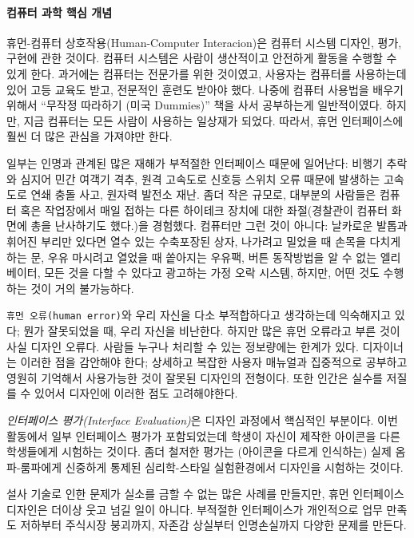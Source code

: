 \documentclass[]{article}
\begin{document}
\mbox{}\paragraph{컴퓨터 과학 핵심 개념}\label{section-268}

휴먼-컴퓨터 상호작용(Human-Computer Interacion)은 컴퓨터 시스템 디자인,
평가, 구현에 관한 것이다. 컴퓨터 시스템은 사람이 생산적이고 안전하게
활동을 수행할 수 있게 한다. 과거에는 컴퓨터는 전문가를 위한 것이였고,
사용자는 컴퓨터를 사용하는데 있어 고등 교육도 받고, 전문적인 훈련도
받아야 했다. 나중에 컴퓨터 사용법을 배우기 위해서 ``무작정 따라하기
(미국 Dummies)'' 책을 사서 공부하는게 일반적이였다. 하지만, 지금
컴퓨터는 모든 사람이 사용하는 일상재가 되었다. 따라서, 휴먼 인터페이스에
훨씬 더 많은 관심을 가져야만 한다.

일부는 인명과 관계된 많은 재해가 부적절한 인터페이스 때문에 일어난다:
비행기 추락와 심지어 민간 여객기 격추, 원격 고속도로 신호등 스위치 오류
때문에 발생하는 고속도로 연쇄 충돌 사고, 원자력 발전소 재난. 좀더 작은
규모로, 대부분의 사람들은 컴퓨터 혹은 작업장에서 매일 접하는 다른
하이테크 장치에 대한 좌절(경찰관이 컴퓨터 화면에 총을 난사하기도
했다.)을 경험했다. 컴퓨터만 그런 것이 아니다: 날카로운 발톱과 휘어진
부리만 있다면 열수 있는 수축포장된 상자, 나가려고 밀었을 때 손목을
다치게 하는 문, 우유 마시려고 열었을 때 쏱아지는 우유팩, 버튼 동작방법을
알 수 없는 엘리베이터, 모든 것을 다할 수 있다고 광고하는 가정 오락
시스템, 하지만, 어떤 것도 수행하는 것이 거의 불가능하다.

\texttt{휴먼 오류(human error)}와 우리 자신을 다소 부적합하다고
생각하는데 익숙해지고 있다; 뭔가 잘못되었을 때, 우리 자신을 비난한다.
하지만 많은 휴먼 오류라고 부른 것이 사실 디자인 오류다. 사람들 누구나
처리할 수 있는 정보량에는 한계가 있다. 디자이너는 이러한 점을 감안해야
한다; 상세하고 복잡한 사용자 매뉴얼과 집중적으로 공부하고 영원히
기억해서 사용가능한 것이 잘못된 디자인의 전형이다. 또한 인간은 실수를
저질를 수 있어서 디자인에 이러한 점도 고려해야한다.

\emph{인터페이스 평가(Interface Evaluation)}은 디자인 과정에서 핵심적인
부분이다. 이번 활동에서 일부 인터페이스 평가가 포함되었는데 학생이
자신이 제작한 아이콘을 다른 학생들에게 시험하는 것이다. 좀더 철저한
평가는 (아이콘을 다르게 인식하는) 실제 옴파-룸파에게 신중하게 통제된
심리학-스타일 실험환경에서 디자인을 시험하는 것이다.

설사 기술로 인한 문제가 실소를 금할 수 없는 많은 사례를 만들지만, 휴먼
인터페이스 디자인은 더이상 웃고 넘길 일이 아니다. 부적절한 인터페이스가
개인적으로 업무 만족도 저하부터 주식시장 붕괴까지, 자존감 상실부터
인명손실까지 다양한 문제를 만든다.
\end{document}
